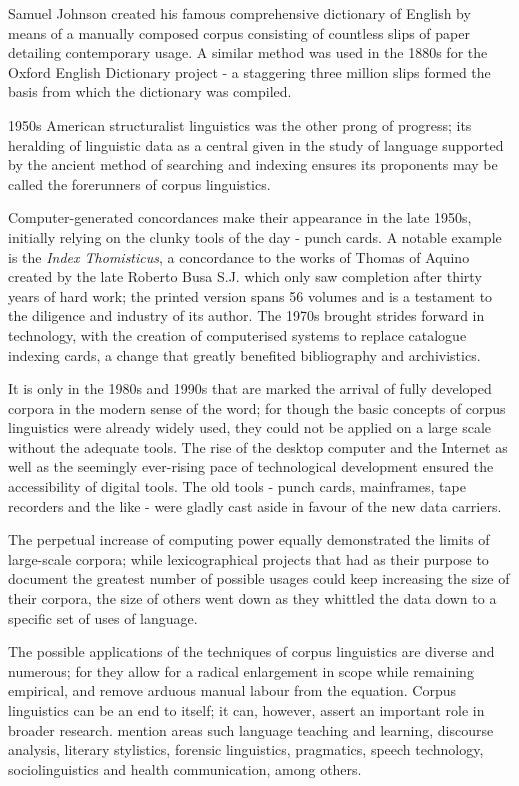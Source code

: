  Samuel Johnson created his famous comprehensive dictionary of English by means
 of a manually composed corpus consisting of countless slips of paper detailing
 contemporary usage. A similar method was used in the 1880s for the Oxford
 English Dictionary project - a staggering three million slips formed the basis
 from which the dictionary was compiled.

 1950s American structuralist linguistics was the other prong of progress; its
 heralding of linguistic data as a central given in the study of language
 supported by the ancient method of searching and indexing ensures its
 proponents may be called the forerunners of corpus linguistics.

Computer-generated concordances make their appearance in the late 1950s,
initially relying on the clunky tools of the day - punch cards. A notable
example is the \emph{Index Thomisticus}, a concordance
to the works of Thomas of Aquino created by the late Roberto Busa S.J. which
only saw completion after thirty years of hard work; the printed version spans
56 volumes and is a testament to the diligence and industry of its author. The
1970s brought strides forward in technology, with the creation of computerised
systems to replace catalogue indexing cards, a change that greatly benefited
bibliography and archivistics.

 It is only in the 1980s and 1990s that are marked the arrival of fully
 developed corpora in the modern sense of the word; for though the basic
 concepts of corpus linguistics were already widely used, they could not be
 applied on a large scale without the adequate tools. The rise of the desktop
 computer and the Internet as well as the seemingly ever-rising pace of
 technological development ensured the accessibility of digital tools.  The old
 tools - punch cards, mainframes, tape recorders and the like - were gladly
 cast aside in favour of the new data carriers.

 The perpetual increase of computing power equally demonstrated the limits of
 large-scale corpora; while lexicographical projects that had as their purpose
 to document the greatest number of possible usages could keep increasing the
 size of their corpora, the size of others went down as they whittled the data
 down to a specific set of uses of language.

 The possible applications of the techniques of corpus linguistics are diverse
 and numerous; for they allow for a radical enlargement in scope while
 remaining empirical, and remove arduous manual labour from the equation.
 Corpus linguistics can be an end to itself; it can, however, assert an
 important role in broader research.  \citet[7]{okeeffe2010} mention areas such
 language teaching and learning, discourse analysis, literary stylistics,
 forensic linguistics, pragmatics, speech technology, sociolinguistics and
 health communication, among others.


